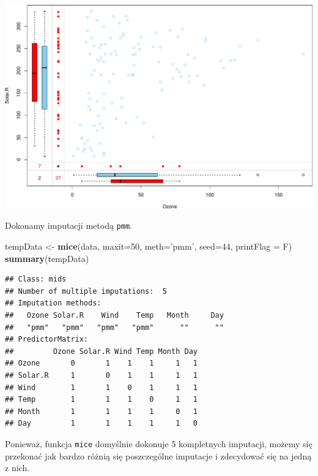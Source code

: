\documentclass[]{book}
\newenvironment{Shaded}{\begin{snugshade}}{\end{snugshade}}
\newcommand{\DataTypeTok}[1]{\textcolor[rgb]{0.13,0.29,0.53}{#1}}
\newcommand{\DecValTok}[1]{\textcolor[rgb]{0.00,0.00,0.81}{#1}}
\newcommand{\KeywordTok}[1]{\textcolor[rgb]{0.13,0.29,0.53}{\textbf{#1}}}
\newcommand{\NormalTok}[1]{#1}
\newcommand{\OperatorTok}[1]{\textcolor[rgb]{0.81,0.36,0.00}{\textbf{#1}}}
\newcommand{\StringTok}[1]{\textcolor[rgb]{0.31,0.60,0.02}{#1}}
\theoremstyle{plain}
\theoremstyle{definition}
\theoremstyle{definition}
\theoremstyle{definition}
\theoremstyle{definition}
\theoremstyle{remark}
\begin{document}
\includegraphics{EksploracjaDanych_files/figure-latex/unnamed-chunk-5-1.pdf}

Dokonamy imputacji metodą \texttt{pmm}.

\begin{Shaded}
\begin{Highlighting}[]
\NormalTok{tempData <-}\StringTok{ }\KeywordTok{mice}\NormalTok{(data, }
                 \DataTypeTok{maxit=}\DecValTok{50}\NormalTok{, }
                 \DataTypeTok{meth=}\StringTok{'pmm'}\NormalTok{, }
                 \DataTypeTok{seed=}\DecValTok{44}\NormalTok{, }
                 \DataTypeTok{printFlag =}\NormalTok{ F)}
\KeywordTok{summary}\NormalTok{(tempData)}
\end{Highlighting}
\end{Shaded}

\begin{verbatim}
## Class: mids
## Number of multiple imputations:  5 
## Imputation methods:
##   Ozone Solar.R    Wind    Temp   Month     Day 
##   "pmm"   "pmm"   "pmm"   "pmm"      ""      "" 
## PredictorMatrix:
##         Ozone Solar.R Wind Temp Month Day
## Ozone       0       1    1    1     1   1
## Solar.R     1       0    1    1     1   1
## Wind        1       1    0    1     1   1
## Temp        1       1    1    0     1   1
## Month       1       1    1    1     0   1
## Day         1       1    1    1     1   0
\end{verbatim}

Ponieważ, funkcja \texttt{mice} domyślnie dokonuje 5 kompletnych imputacji, możemy się przekonać jak bardzo różnią się poszczególne imputacje i zdecydować się na jedną z nich.

\begin{Shaded}
\end{Shaded}
\end{document}
